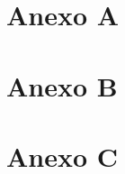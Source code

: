 \documentclass[oneside,11pt]{Latex/Classes/PhDthesisPSnPDF}
\begin{document}
\appendix
\renewcommand{\thechapter}{\Alph{chapter}}

\chapter{Anexo A}

\chapter{Anexo B}

\chapter{Anexo C}

\renewcommand{\bibname}{Lista de Referencias}
 
 

\end{document}
